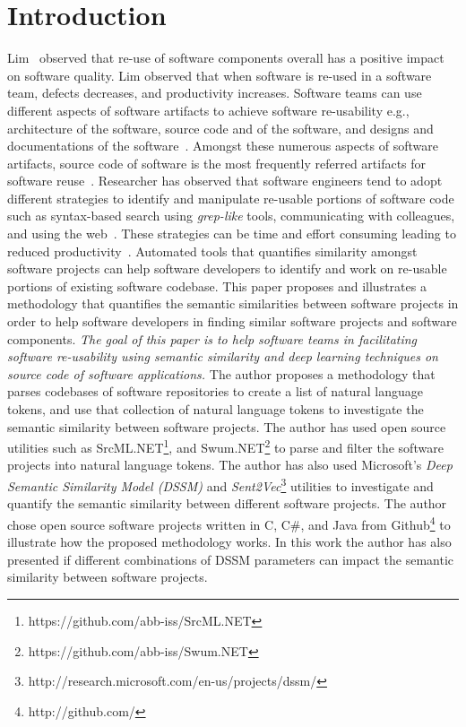 \documentclass[conference]{IEEEtran}
\begin{document}

\section{Introduction}


Lim~\cite{Lim:Reuse:Quality} observed that re-use of software components overall has a positive impact on software quality. Lim observed that when software is re-used in a software team, defects decreases, and productivity increases. Software teams can use different aspects of software artifacts to achieve software re-usability e.g., architecture of the software, source code and of the software, and designs and documentations of the software~\cite{Reuse:Aspects:Frakes}. Amongst these numerous aspects of software artifacts, source code of software is the most frequently referred artifacts for software reuse~\cite{Google:SoftwareReuse}. Researcher has observed that software engineers tend to adopt different strategies to identify and manipulate re-usable portions of software code such as syntax-based search using \textit{grep-like} tools, communicating with colleagues, and using the web~\cite{Google:SoftwareReuse}. These strategies can be time and effort consuming leading to reduced productivity~\cite{zimmerman:code:search}. Automated tools that quantifies similarity amongst software projects can help software developers to identify and work on re-usable portions of existing software codebase. This paper proposes and illustrates a methodology that quantifies the semantic similarities between software projects in order to help software developers in finding similar software projects and software components.
\textit{The goal of this paper is to help software teams in facilitating software re-usability using semantic similarity and deep learning techniques on source code of software applications.}
The author proposes a methodology that parses codebases of software repositories to create a list of natural language tokens, and use that collection of natural language tokens to investigate the semantic similarity between software projects. The author has used open source utilities such as SrcML.NET\footnote{https://github.com/abb-iss/SrcML.NET}, and Swum.NET\footnote{https://github.com/abb-iss/Swum.NET} to parse and filter the software projects into natural language tokens. The author has also used Microsoft's \textit{Deep Semantic Similarity Model (DSSM)} and \textit{Sent2Vec}\footnote{http://research.microsoft.com/en-us/projects/dssm/} utilities to investigate and quantify the semantic similarity between different software projects. The author chose open source software projects written in C, C\#, and Java from Github\footnote{http://github.com/} to illustrate how the proposed methodology works. In this work the author has also presented if different combinations of DSSM parameters can impact the semantic similarity between software projects. 
\end{document}
